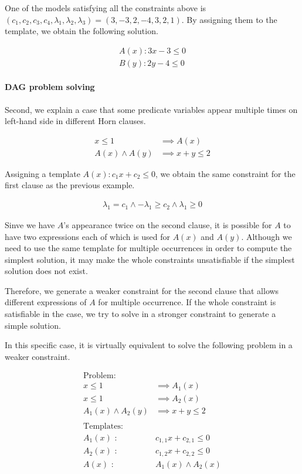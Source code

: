\documentclass[master,final,12pt]{iscs-thesis}
\begin{document}
One of the models satisfying all the constraints above is
$( c_1, c_2, c_3, c_4, \lambda_1, \lambda_2, \lambda_3 ) = (3, -3, 2, -4, 3, 2, 1)$.
By assigning them to the template, we obtain the following solution.

\begin{align*}
A(x) : 3 x - 3 \leq 0 \\
B(y) : 2 y - 4 \leq 0
\end{align*}

\paragraph {DAG problem solving}
Second, we explain a case that some predicate variables appear
multiple times on left-hand side in different Horn clauses.

\begin{align*}
x \leq 1 & \implies A(x) \\
A(x) \wedge A(y) & \implies x+y \leq 2
\end{align*}

Assigning a template $A(x) : c_1 x + c_2 \leq 0$, we obtain the same
constraint for the first clause as the previous example.

\begin{align} \label{eq:constr1}
\lambda_1 = c_1 \wedge - \lambda_1 \geq c_2 \wedge \lambda_1 \geq 0
\end{align}

Sinve we have $A$'s appearance twice on the second clause, it is
possible for $A$ to have two expressions each of which is used for
$A(x)$ and $A(y)$.  Although we need to use the same template for
multiple occurrences in order to compute the simplest solution, it may
make the whole constraints unsatisfiable if the simplest solution does
not exist.

Therefore, we generate a weaker constraint for the second clause that
allows different expressions of $A$ for multiple occurrence.  If the
whole constraint is satisfiable in the case, we try to solve in a
stronger constraint to generate a simple solution.

In this specific case, it is virtually equivalent to solve the
following problem in a weaker constraint.

\begin{align*}
\text{Problem:} \\
x \leq 1 & \implies A_1(x) \\
x \leq 1 & \implies A_2(x) \\
A_1(x) \wedge A_2(y) & \implies x+y \leq 2 \\
\\
\text{Templates:} \\
A_1(x) \text{ : } & c_{1,1} x + c_{2,1} \leq 0 \\
A_2(x) \text{ : } & c_{1,2} x + c_{2,2} \leq 0 \\
A(x) \text{ : } & A_1(x) \wedge A_2(x) \\
\end{align*}
\end{document}
